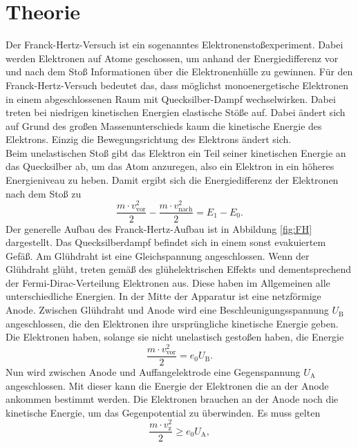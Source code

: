 \section{Theorie}
\label{sec:Theorie}
Der Franck-Hertz-Versuch ist ein sogenanntes Elektronenstoßexperiment. Dabei werden Elektronen 
auf Atome geschossen, um anhand der Energiedifferenz vor und nach dem Stoß Informationen 
über die Elektronenhülle zu gewinnen. Für den Franck-Hertz-Versuch bedeutet das, dass 
möglichst monoenergetische Elektronen in einem abgeschlossenen Raum mit Quecksilber-Dampf wechselwirken.
Dabei treten bei niedrigen kinetischen Energien elastische Stöße auf. Dabei ändert sich auf Grund des großen Massenunterschieds 
kaum die kinetische Energie des Elektrons. Einzig die Bewegungsrichtung des Elektrons
ändert sich.\\
Beim unelastischen Stoß gibt das Elektron ein Teil seiner kinetischen Energie an das Quecksilber ab, 
um das Atom anzuregen, also ein Elektron in ein höheres Energieniveau zu heben.
Damit ergibt sich die Energiedifferenz der Elektronen nach dem Stoß zu
\begin{equation} 
    \frac{m\cdot v_\text{vor}^2}{2}-\frac{m\cdot v_\text{nach}^2}{2}=E_1-E_0.
    \label{eq:diff}
\end{equation}
Der generelle Aufbau des Franck-Hertz-Aufbau ist in Abbildung \ref{fig:FH} dargestellt.
Das Quecksilberdampf befindet sich in einem sonst evakuiertem Gefäß. Am Glühdraht ist eine Gleichspannung 
angeschlossen. Wenn der Glühdraht glüht, treten gemäß des glühelektrischen Effekts und dementsprechend
der Fermi-Dirac-Verteilung Elektronen aus. Diese haben im Allgemeinen alle unterschiedliche Energien.
In der Mitte der Apparatur ist eine netzförmige Anode. Zwischen Glühdraht und Anode wird 
eine Beschleunigungsspannung $U_\text{B}$ angeschlossen, die den Elektronen ihre ursprüngliche kinetische Energie geben.
Die Elektronen haben, solange sie nicht unelastisch gestoßen haben, die Energie
\begin{equation} 
    \frac{m\cdot v_\text{vor}^2}{2}=e_0U_\text{B}.
    \label{eq:ekin}
\end{equation}
Nun wird zwischen Anode und Auffangelektrode eine Gegenspannung $U_\text{A}$ angeschlossen. Mit dieser kann
die Energie der Elektronen die an der Anode ankommen bestimmt werden. Die Elektronen brauchen an der Anode noch die kinetische 
Energie, um das Gegenpotential zu überwinden. Es muss gelten 
\begin{equation}
    \label{eq:minE}
    \frac{m\cdot v_\text{z}^2}{2} \geq e_0U_\text{A},
\end{equation}
